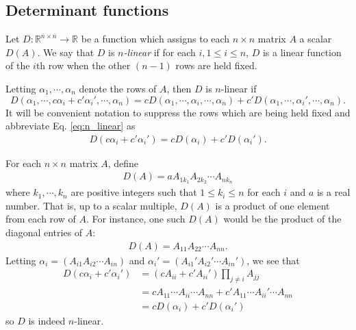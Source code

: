 \documentclass[12pt,letterpaper,reqno]{article}
\numberwithin{equation}{section}
\newcommand{\ti}[1]{\textit{#1}}
\begin{document}
\subsection{Determinant functions}
\begin{defn}
	Let $D:\mathbb{R}^{\overline{n} \times \overline{n}} \to \mathbb{R}$ be a function which assigns to each $n \times n$ matrix $A$ a scalar $D(A)$. We say that $D$ is \ti{$n$-linear} if for each $i, 1 \leq i \leq n$, $D$ is a linear function of the $i$th row when the other $(n-1)$ rows are held fixed.
	
	Letting $\alpha_1,\cdots,\alpha_n$ denote the rows of $A$, then $D$ is $n$-linear if 
	\begin{equation}\label{eq:n_linear}
	D(\alpha_1,\cdots,c\alpha_i+c'\alpha_i',\cdots,\alpha_n)=cD(\alpha_1,\cdots,\alpha_i,\cdots,\alpha_n)+c'D(\alpha_1,\cdots,\alpha_i',\cdots,\alpha_n).
	\end{equation} 
	It will be convenient notation to suppress the rows which are being held fixed and abbreviate Eq. \eqref{eq:n_linear} as 
	\begin{align*}
		D(c\alpha_i+c'\alpha_i')=cD(\alpha_i)+c'D(\alpha_i').
	\end{align*}
\end{defn}

\begin{example}
For each $n \times n$ matrix $A$, define
\begin{align*}
	D(A)=aA_{1k_1}A_{2k_2}\cdots A_{nk_n}
\end{align*}
where $k_1,\cdots,k_n$ are positive integers such that $1 \leq k_i \leq n$ for each $i$ and $a$ is a real number. That is, up to a scalar multiple, $D(A)$ is a product of one element from each row of $A$. For instance, one such $D(A)$ would be the product of the diagonal entries of $A$:
\begin{align*}
	D(A)=A_{11}A_{22}\cdots A_{nn}.
\end{align*}
Letting $\alpha_i=(A_{i1}A_{i2}\cdots A_{in})$ and $\alpha_i'=(A_{i1}'A_{i2}'\cdots A_{in}')$, we see that
\begin{align*}
	D(c\alpha_i+c'\alpha_i')&=(cA_{ii}+c'A_{ii}')\prod_{j \neq i}A_{jj} \\
	&=cA_{11}\cdots A_{ii}\cdots A_{nn}+c'A_{11} \cdots A_{ii}'\cdots A_{nn} \\
	&=cD(\alpha_i)+c'D(\alpha_i')
\end{align*}
so $D$ is indeed $n$-linear. 
\end{example}
\end{document}
